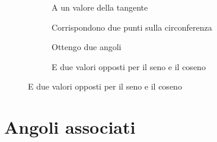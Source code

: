 \begin{figure}
	\begin{subfigure}[b]{.5\linewidth}
		\centering
		\caption{A un valore della tangente}\label{fig:SenoCosenoNototangente1}
	\end{subfigure}%
	\begin{subfigure}[b]{.5\linewidth}
		\centering
		\caption{Corrispondono due punti sulla circonferenza}\label{fig:SenoCosenoNototangente2}
	\end{subfigure}
	\begin{subfigure}[b]{.5\linewidth}
		\centering
		\caption{Ottengo due angoli}\label{fig:SenoCosenoNototangente3}
	\end{subfigure}%
	\begin{subfigure}[b]{.5\linewidth}
		\centering
		\caption{E due valori opposti per il seno e il coseno}\label{fig:SenoCosenoNototangente4}
	\end{subfigure}
	\label{fig:senocosenoNototangentEs1}
\end{figure}
\section{Angoli associati}
\label{sec:goniometriaAngoliAssociati}
